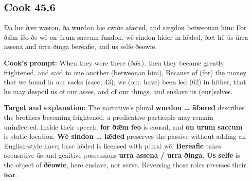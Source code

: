 \par\begin{minipage}{\linewidth}\raggedright
\subsection*{Cook 45.6}

Ðā hīe ðǣr wǣron, ðā wurdon hīe swīðe āfǣred, and sægdon betwēonan him: For ðǣm fēo ðe wē on ūrum saccum fundon, wē sindon hider in lǣded, ðæt hē ūs ūrra assena and ūrra ðinga berēafie, and ūs selfe ðēowie.

\textbf{Cook’s prompt:} When they were there (ðǣr), then they became greatly frightened, and said to one another (betwēonan him), Because of (for) the money that we found in our sacks (sacc, 43), we (om. have) been led (62) in hither, that he may despoil us of our asses, and of our things, and enslave us (our)selves.

\textbf{Target and explanation:} The narrative’s plural \textbf{wurdon … āfǣred} describes the brothers becoming frightened; a predicative participle may remain uninflected. Inside their speech, \textbf{for ðǣm fēo} is causal, and \textbf{on ūrum saccum} is static location. \textbf{Wē sindon … lǣded} preserves the passive without adding an English-style have; base lǣded is licensed with plural wē. \textbf{Berēafie} takes accusative ūs and genitive possessions \textbf{ūrra assena /\allowbreak{} ūrra ðinga}. \textbf{Ūs selfe} is the object of \textbf{ðēowie}, here enslave, not serve. Reversing those roles reverses their fear.

\end{minipage}\par\addvspace{4pt}

